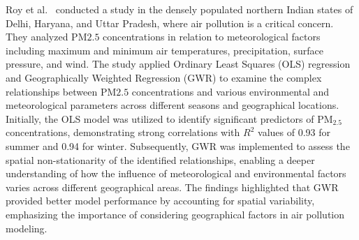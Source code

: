 \documentclass[twoside,11pt]{article}
\begin{document}
Roy et al.\ \citep{ROY20244106} conducted a study in the densely populated northern Indian states of Delhi, Haryana, and Uttar Pradesh, where air pollution is a critical concern. They analyzed PM${2.5}$ concentrations in relation to meteorological factors including maximum and minimum air temperatures, precipitation, surface pressure, and wind. The study applied Ordinary Least Squares (OLS) regression and Geographically Weighted Regression (GWR) to examine the complex relationships between PM${2.5}$ concentrations and various environmental and meteorological parameters across different seasons and geographical locations. Initially, the OLS model was utilized to identify significant predictors of PM$_{2.5}$ concentrations, demonstrating strong correlations with $R^2$ values of 0.93 for summer and 0.94 for winter. Subsequently, GWR was implemented to assess the spatial non-stationarity of the identified relationships, enabling a deeper understanding of how the influence of meteorological and environmental factors varies across different geographical areas. The findings highlighted that GWR provided better model performance by accounting for spatial variability, emphasizing the importance of considering geographical factors in air pollution modeling.


\newpage










\end{document}

